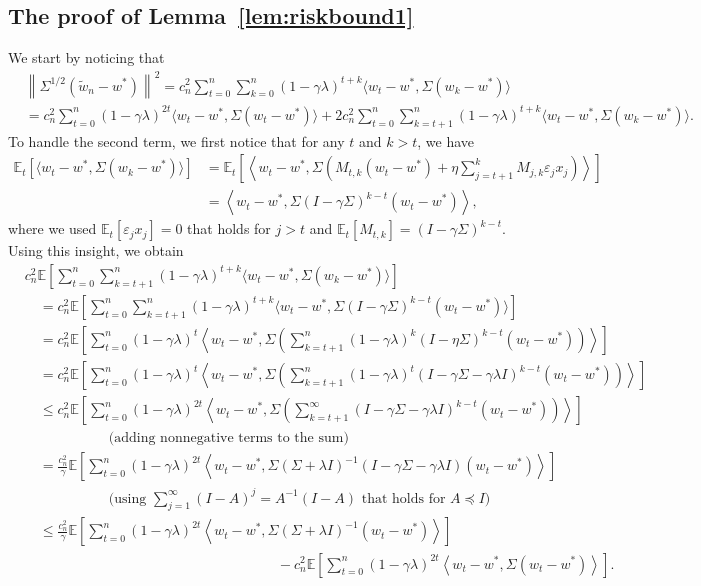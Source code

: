 \documentclass[final,12pt]{colt2018} %
\newcommand{\EE}[1]{\mathbb{E}\left[#1\right]}
\newcommand{\EEt}[1]{\mathbb{E}_t\left[#1\right]}
\newcommand{\norm}[1]{\left\|#1\right\|}
\newcommand{\pa}[1]{\left(#1\right)}
\newcommand{\wt}{\widetilde}
\newcommand{\tw}{\wt{w}}
\newcommand{\iprod}[2]{\left\langle#1, #2\right\rangle}
\newcommand{\Iprod}[2]{\bigl\langle#1, #2\bigr\rangle}
\begin{document}
\subsection{The proof of Lemma~\ref{lem:riskbound1}}\label{app:riskbound1}
We start by noticing that
\begin{align}\label{eq:expansion}
 &\norm{\Sigma^{1/2} \pa{\tw_n - w^*}}^2 = c_n^2 \sum_{t=0}^n \sum_{k=0}^n (1-\gamma\lambda)^{t+k} \Iprod{w_t - w^*}{\Sigma 
\pa{w_k - w^*}}
\\
&= c_n^2 \sum_{t=0}^n (1-\gamma\lambda)^{2t} \Iprod{w_t \!-\! w^*}{\Sigma \pa{w_t \!-\! w^*}}  + 2 c_n^2 \sum_{t=0}^n 
\sum_{k=t+1}^n (1-\gamma\lambda)^{t+k} \Iprod{w_t \!-\! w^*}{\Sigma \pa{w_k \!-\! w^*}}.\nonumber
\end{align}
To handle the second term, we first notice that for any $t$ and $k>t$, we have
\begin{align*}
 \EEt{\Iprod{w_t - w^*}{\Sigma \pa{w_k - w^*}}} &= \EEt{\iprod{w_t - w^*}{\Sigma \pa{M_{t,k} \pa{w_t - w^*} + \eta 
\sum_{j=t+1}^k M_{j,k} \varepsilon_j x_j}}}
\\
&=  \iprod{w_t - w^*}{\Sigma \pa{I - \gamma \Sigma}^{k-t} \pa{w_t - w^*}},
\end{align*}
where we used $\EEt{\varepsilon_j x_j} = 0$ that holds for $j>t$ and $\EEt{M_{t,k}} = 
\pa{I - \gamma \Sigma}^{k-t}$. Using this insight, we obtain
\begin{align*}
&c_n^2 \EE{\sum_{t=0}^n \sum_{k=t+1}^n (1-\gamma\lambda)^{t+k} \Iprod{w_t - w^*}{\Sigma \pa{w_k - w^*}}}
\\
 &\quad = c_n^2 \EE{\sum_{t=0}^n \sum_{k=t+1}^n (1-\gamma\lambda)^{t+k} \Iprod{w_t - w^*}{\Sigma \pa{I - \gamma \Sigma}^{k-t} \pa{w_t - 
w^*}}}
 \\
 &\quad = c_n^2 \EE{\sum_{t=0}^n (1-\gamma\lambda)^t \iprod{w_t - w^*}{\Sigma \pa{\sum_{k=t+1}^{n} \pa{1-\gamma\lambda}^k 
\pa{I-\eta\Sigma}^{k-t} \pa{w_t - w^*}}}}
\\
 &\quad = c_n^2 \EE{\sum_{t=0}^n (1-\gamma\lambda)^t \iprod{w_t - w^*}{\Sigma \pa{\sum_{k=t+1}^{n} \pa{1-\gamma\lambda}^t 
\pa{I-\gamma\Sigma - \gamma\lambda I}^{k-t} \pa{w_t - w^*}}}}
\\
 &\quad \le c_n^2 \EE{\sum_{t=0}^n (1-\gamma\lambda)^{2t} \iprod{w_t - w^*}{\Sigma \pa{\sum_{k=t+1}^{\infty} \pa{I-\gamma\Sigma - 
\gamma\lambda I}^{k-t} \pa{w_t - w^*}}} }
\\
 &\qquad\qquad\qquad\mbox{(adding nonnegative terms to the sum)}
\\
 &\quad = \frac{c_n^2}{\gamma} \EE{\sum_{t=0}^n (1-\gamma\lambda)^{2t} \iprod{w_t - w^*}{\Sigma \pa{\Sigma + \lambda 
I}^{-1} \pa{I-\gamma\Sigma - \gamma\lambda I} \pa{w_t - w^*}}}
\\
 &\qquad\qquad\qquad\mbox{(using $\sum_{j=1}^\infty (I - A)^j = A^{-1} \pa{I - A}$ that holds for $A\preccurlyeq I$)}
\\
 &\quad \le \frac{c_n^2}{\gamma} \EE{\sum_{t=0}^n (1-\gamma\lambda)^{2t} \iprod{w_t - w^*}{\Sigma \pa{\Sigma + \lambda I}^{-1} 
\pa{w_t - w^*}}}  
\\
&\qquad\qquad\qquad\qquad\qquad\qquad\qquad\qquad\qquad - c_n^2 \EE{\sum_{t=0}^n (1-\gamma\lambda)^{2t} \iprod{w_t - w^*}{\Sigma \pa{w_t - 
w^*}}}.
\end{align*}
\end{document}
